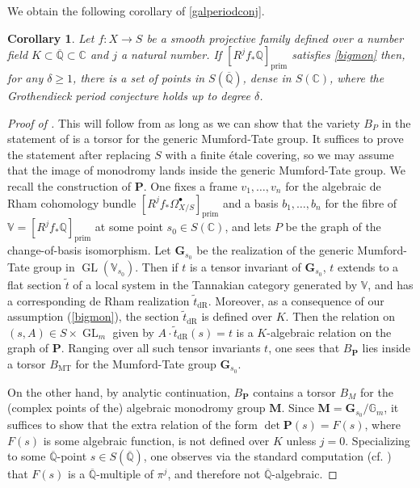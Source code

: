 \documentclass[10pt]{article}
\numberwithin{equation}{section}
\theoremstyle{plain}
\newtheorem{cor}[thm]{Corollary}
\theoremstyle{definition}
\theoremstyle{remark}
\newcommand{\GL}{\operatorname{GL}}
\newcommand{\Qbar}{\overline{\mathbb{Q}}}
\newcommand{\Q}{\mathbb{Q}}
\newcommand{\V}{\mathbb{V}}
\begin{document}
We obtain the following corollary of \autoref{galperiodconj}.
 
\begin{cor}\label{mainthmonperiod}
Let $f : X \to S$ be a smooth projective family defined over a number field $K \subset \Qbar \subset \mathbb{C}$ and $j$ a natural number. If $[R^jf_*\Q]_{\operatorname{prim}}$ satisfies \eqref{bigmon} then, for any $\delta \geq 1$, there is a set of points in $S(\Qbar)$, dense in $S(\mathbb{C})$, where the Grothendieck period conjecture holds up to degree $\delta$.
\end{cor}

\begin{proof}[Proof of ]
    This will follow from  as long as we can show that the variety $B_{P}$ in the statement of  is a torsor for the generic Mumford-Tate group. It suffices to prove the statement after replacing $S$ with a finite \'etale covering, so we may assume that the image of monodromy lands inside the generic Mumford-Tate group. We recall the construction of $\mathbf{P}$. One fixes a frame $v_{1}, \hdots, v_{n}$ for the algebraic de Rham cohomology bundle $[R^{j} f_{*} \Omega^{\bullet}_{X/S}]_{\operatorname{prim}}$ and a basis $b_{1}, \hdots, b_{n}$ for the fibre of $\V = [R^{j} f_{*} \mathbb{Q}]_{\operatorname{prim}}$ at some point $s_{0} \in S(\mathbb{C})$, and lets $P$ be the graph of the change-of-basis isomorphism. Let $\mathbf{G}_{s_{0}}$ be the realization of the generic Mumford-Tate group in $\GL(\V_{s_{0}})$. Then if $t$ is a tensor invariant of $\mathbf{G}_{s_{0}}$, $t$ extends to a flat section $\widetilde{t}$ of a local system in the Tannakian category generated by $\V$, and has a corresponding de Rham realization $\widetilde{t}_{\operatorname{dR}}$. Moreover, as a consequence of our assumption (\ref{bigmon}), the section $\widetilde{t}_{\operatorname{dR}}$ is defined over $K$. Then the relation on $(s, A) \in S \times \GL_{m}$ given by $A \cdot \widetilde{t}_{\operatorname{dR}}(s) = t$ is a $K$-algebraic relation on the graph of $\mathbf{P}$. Ranging over all such tensor invariants $t$, one sees that $B_{\mathbf{P}}$ lies inside a torsor $B_{\operatorname{MT}}$ for the Mumford-Tate group $\mathbf{G}_{s_{0}}$.

    On the other hand, by analytic continuation, $B_{\mathbf{P}}$ contains a torsor $B_{M}$ for the (complex points of the) algebraic monodromy group $\mathbf{M}$. Since $\mathbf{M} = \mathbf{G}_{s_{0}} / \mathbb{G}_{m}$, it suffices to show that the extra relation of the form $\det \mathbf{P}(s) = F(s)$, where $F(s)$ is some algebraic function, is not defined over $K$ unless $j = 0$. Specializing to some $\Qbar$-point $s \in S(\Qbar)$, one observes via the standard computation (cf. \cite[\S1]{zbMATH03853242}) that $F(s)$ is a $\Qbar$-multiple of $\pi^j$, and therefore not $\Qbar$-algebraic.
\end{proof}
\end{document}
